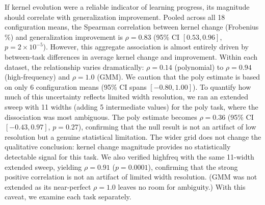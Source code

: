 \documentclass[twoside,11pt]{article}
\begin{document}
If kernel evolution were a reliable indicator of learning progress, its magnitude should correlate with generalization improvement.  Pooled across all 18 configuration means, the Spearman correlation between kernel change (Frobenius \%) and generalization improvement is $\rho=0.83$ (95\% CI $[0.53, 0.96]$, $p=2\times10^{-5}$).  However, this aggregate association is almost entirely driven by between-task differences in average kernel change and improvement. Within each dataset, the relationship varies dramatically: $\rho=0.14$ (polynomial) to $\rho=0.94$ (high-frequency) and $\rho=1.0$ (GMM).  We caution that the poly estimate is based on only 6 configuration means (95\% CI spans $[-0.80, 1.00]$). To quantify how much of this uncertainty reflects limited width resolution, we ran an extended sweep with 11 widths (adding 5 intermediate values) for the poly task, where the dissociation was most ambiguous. The poly estimate becomes $\rho=0.36$ (95\% CI $[-0.43, 0.97]$, $p=0.27$), confirming that the null result is not an artifact of low resolution but a genuine statistical limitation. The wider grid does not change the qualitative conclusion: kernel change magnitude provides no statistically detectable signal for this task. We also verified highfreq with the same 11-width extended sweep, yielding $\rho=0.91$ ($p=0.0001$), confirming that the strong positive correlation is not an artifact of limited width resolution. (GMM was not extended as its near-perfect $\rho=1.0$ leaves no room for ambiguity.) With this caveat, we examine each task separately.
\end{document}
